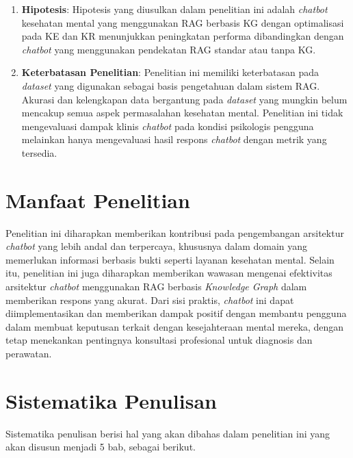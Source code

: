 \begin{enumerate}
	\item	\textbf{Hipotesis}: Hipotesis yang diusulkan dalam penelitian ini adalah \textit{chatbot} kesehatan mental yang menggunakan RAG berbasis KG dengan optimalisasi pada KE dan KR menunjukkan peningkatan performa dibandingkan dengan \textit{chatbot} yang menggunakan pendekatan RAG standar atau tanpa KG.
	\item	\textbf{Keterbatasan Penelitian}: Penelitian ini memiliki keterbatasan pada \textit{dataset} yang digunakan sebagai basis pengetahuan dalam sistem RAG.
	      Akurasi dan kelengkapan data bergantung pada \textit{dataset} yang mungkin belum mencakup semua aspek permasalahan kesehatan mental.
	      Penelitian ini tidak mengevaluasi dampak klinis \textit{chatbot} pada kondisi psikologis pengguna melainkan hanya mengevaluasi hasil respons \textit{chatbot} dengan metrik yang tersedia.
\end{enumerate}

\section{Manfaat Penelitian}
Penelitian ini diharapkan memberikan kontribusi pada pengembangan arsitektur \textit{chatbot} yang lebih andal dan terpercaya, khususnya dalam domain yang memerlukan informasi berbasis bukti seperti layanan kesehatan mental.
Selain itu, penelitian ini juga diharapkan memberikan wawasan mengenai efektivitas arsitektur \textit{chatbot} menggunakan RAG berbasis \textit{Knowledge Graph} dalam memberikan respons yang akurat.
Dari sisi praktis, \textit{chatbot} ini dapat diimplementasikan dan memberikan dampak positif dengan membantu pengguna dalam membuat keputusan terkait dengan kesejahteraan mental mereka, dengan tetap menekankan pentingnya konsultasi profesional untuk diagnosis dan perawatan.
\section{Sistematika Penulisan}
Sistematika penulisan berisi hal yang akan dibahas dalam penelitian ini yang akan disusun menjadi 5 bab, sebagai berikut.

